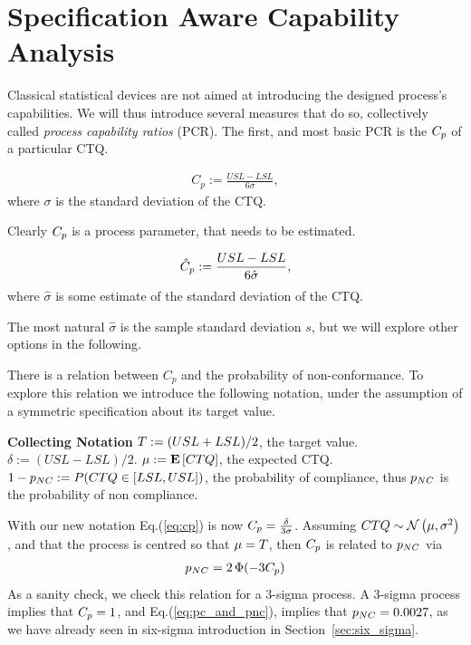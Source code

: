\section{Specification Aware Capability Analysis}
Classical statistical devices are not aimed at introducing the designed process's capabilities.
We will thus introduce several measures that do so, collectively called \emph{process capability ratios} (PCR).
The first, and most basic PCR is the $\cp$ of a particular CTQ.

\begin{definition}[$\cp$]
\begin{align}
\label{eq:cp}
	C_p:= \frac{USL-LSL}{6 \sigma}, 
\end{align}
where $\sigma$ is the standard deviation of the CTQ.

\end{definition}
Clearly $\cp$ is a process parameter, that needs to be estimated.
\begin{definition}[$\cpHat$]
\begin{align}
	\hat{C}_p:= \frac{USL-LSL}{6 \hat{\sigma}}, 
\end{align}
where $\hat{\sigma}$ is some estimate of the standard deviation of the CTQ.
\end{definition}
The most natural $\hat{\sigma}$ is the sample standard deviation $s$, but we will explore other options in the following.


There is a relation between $C_p$ and the probability of non-conformance. 
To explore this relation we introduce the following notation, under the assumption of a symmetric specification about its target value.
\begin{tcolorbox}
\footnotesize
\textbf{Collecting Notation} \newline
$T:= (USL+LSL)/2$, the target value. \newline
$\delta:= (USL-LSL)/2$.  \newline
$\mu:= \mathbf{E}\left[ CTQ \right]$, the expected CTQ. \newline
$1-p_{NC}:= P(CTQ \in [LSL,USL])$, the probability of compliance, thus $p_{NC}$ is the probability of non compliance. 
\end{tcolorbox}

With our new notation Eq.(\ref{eq:cp}) is now $C_p=\frac{\delta}{3 \sigma}$.
Assuming $CTQ \sim \mathcal{N}\left(\mu, \sigma^2\right)$, and that the process is centred so that $\mu=T$, then $\cp$ is related to $p_{NC}$ via
\begin{align}
\label{eq:pc_and_pnc}
 p_{NC}= 2\, \Phi(-3 C_p)
\end{align}
As a sanity check, we check this relation for a 3-sigma process.
A 3-sigma process implies that $C_p=1$, and Eq.(\ref{eq:pc_and_pnc}), implies that $p_{NC}=0.0027$, as we have already seen in six-sigma introduction in Section~\ref{sec:six_sigma}.

